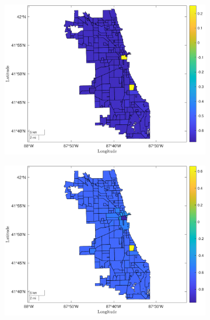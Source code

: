 \documentclass[12pt]{article}
\begin{document}
\begin{figure}[h!]
\centering
    \caption{Home Prices and Residents}
    \begin{subfigure}{0.75\textwidth}
         \centering
         \includegraphics[width=\textwidth]{Pset1/Figures/Single Agent/Counterfactual/Fix utility/housing.pdf}
    \end{subfigure}  
    \begin{subfigure}{0.75\textwidth}
         \centering
         \includegraphics[width=\linewidth]{Pset1/Figures/Single Agent/Counterfactual/Fix utility/residents.pdf}
    \end{subfigure}
    \label{fig:pop_house_res}
\end{figure}
\end{document}
